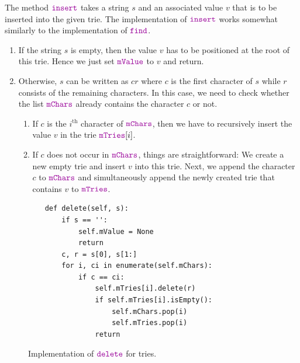 The method $\mytt{insert}$ takes a string $s$ and an associated value $v$ that is to be inserted
into the given trie.  The implementation of $\mytt{insert}$ works somewhat similarly to the
implementation of $\mytt{find}$.
\begin{enumerate}
\item If the string $s$ is empty, then the value $v$ has to be positioned at the root of this trie.
      Hence we just set $\mytt{mValue}$ to $v$ and return.
\item Otherwise, $s$ can be written as $cr$ where $c$ is the first character of $s$ while $r$
      consists of the remaining characters.  In this case, we need to check whether the list
      $\mytt{mChars}$ already contains the character $c$ or not.
      \begin{enumerate}
      \item If $c$ is the $i^\textrm{th}$ character of $\mytt{mChars}$, then we have to recursively insert the value $v$
            in the trie $\mytt{mTries}[i]$.  
      \item If $c$ does not occur in $\mytt{mChars}$, things are straightforward: We create a new
            empty trie and insert $v$ into this trie.  Next, we append the character $c$ to
            $\mytt{mChars}$ and simultaneously append the newly created trie that contains $v$ to
            $\mytt{mTries}$. 
      \end{enumerate}
\end{enumerate}

\begin{figure}[!ht]
\centering
\begin{verbatim}
    def delete(self, s):
        if s == '':
            self.mValue = None
            return
        c, r = s[0], s[1:]
        for i, ci in enumerate(self.mChars):
            if c == ci:
                self.mTries[i].delete(r)
                if self.mTries[i].isEmpty():
                    self.mChars.pop(i)
                    self.mTries.pop(i)
                return
\end{verbatim}
\vspace*{-0.3cm}
\caption{Implementation of $\mytt{delete}$ for tries.}
\label{fig:trie.ipython-delete}
\end{figure}

